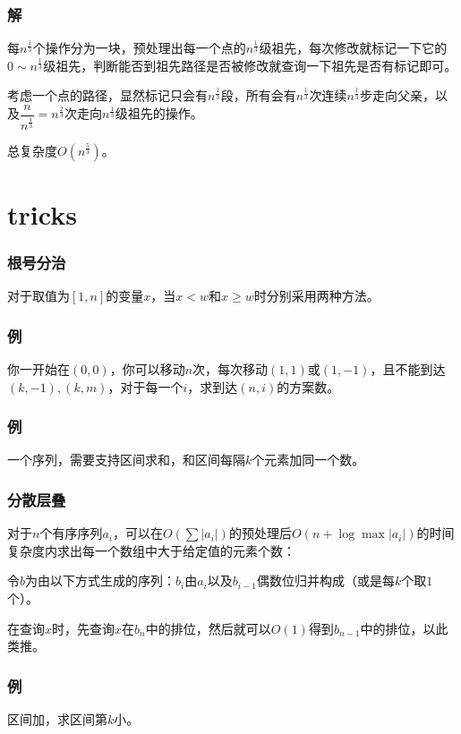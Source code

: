 \documentclass[10pt]{beamer}
\begin{document}
	\begin{frame}
		\frametitle{解}
	
		每$n^\frac 13$个操作分为一块，预处理出每一个点的$n^\frac 13$级祖先，每次修改就标记一下它的$0\sim n^\frac 13$级祖先，判断能否到祖先路径是否被修改就查询一下祖先是否有标记即可。

		考虑一个点的路径，显然标记只会有$n^\frac 13$段，所有会有$n^\frac 13$次连续$n^\frac 13$步走向父亲，以及$\dfrac n{n^\frac 13}=n^\frac 23$次走向$n^\frac 13$级祖先的操作。

		总复杂度$O(n^\frac 53)$。
	
	\end{frame}
	\section{tricks}
	\begin{frame}
		\frametitle{根号分治}
	
		对于取值为$[1,n]$的变量$x$，当$x<w$和$x\ge w$时分别采用两种方法。
	
	\end{frame}
	\begin{frame}
		\frametitle{例}
	
		你一开始在$(0,0)$，你可以移动$n$次，每次移动$(1,1)$或$(1,-1)$，且不能到达$(k,-1),(k,m)$，对于每一个$i$，求到达$(n,i)$的方案数。
	
	\end{frame}
	\begin{frame}
		\frametitle{例}
	
		一个序列，需要支持区间求和，和区间每隔$k$个元素加同一个数。
	
	\end{frame}
	\begin{frame}
		\frametitle{分散层叠}
	
		对于$n$个有序序列$a_i$，可以在$O(\sum |a_i|)$的预处理后$O(n+\log \max |a_i|)$的时间复杂度内求出每一个数组中大于给定值的元素个数：

		令$b$为由以下方式生成的序列：$b_i$由$a_i$以及$b_{i-1}$偶数位归并构成（或是每$k$个取$1$个）。

		在查询$x$时，先查询$x$在$b_n$中的排位，然后就可以$O(1)$得到$b_{n-1}$中的排位，以此类推。
	
	\end{frame}
	\begin{frame}
		\frametitle{例}
	
		区间加，求区间第$k$小。
	
	\end{frame}
\end{document}
